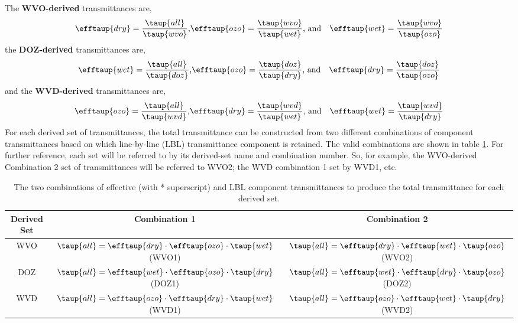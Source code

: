 The \textbf{WVO-derived} transmittances are,
\begin{eqnarray}
  \efftaup{dry} = \frac{\taup{all}}{\taup{wvo}}\textrm{,} & \efftaup{ozo} = \displaystyle\frac{\taup{wvo}}{\taup{wet}} \textrm{, and} & \efftaup{wet} = \frac{\taup{wvo}}{\taup{ozo}}
\end{eqnarray}
the \textbf{DOZ-derived} transmittances are,
\begin{eqnarray}
  \efftaup{wet} = \frac{\taup{all}}{\taup{doz}}\textrm{,} & \efftaup{ozo} = \displaystyle\frac{\taup{doz}}{\taup{dry}} \textrm{, and} & \efftaup{dry} = \frac{\taup{doz}}{\taup{ozo}}
\end{eqnarray}
and the \textbf{WVD-derived} transmittances are,
\begin{eqnarray}
  \efftaup{ozo} = \frac{\taup{all}}{\taup{wvd}}\textrm{,} & \efftaup{dry} = \displaystyle\frac{\taup{wvd}}{\taup{wet}} \textrm{, and} & \efftaup{wet} = \frac{\taup{wvd}}{\taup{dry}}
\end{eqnarray}
For each derived set of transmittances, the total transmittance can be constructed from two different combinations of component transmittances based on which line-by-line (LBL) transmittance component is retained. The valid combinations are shown in table \ref{tab:derived_set_combo}. For further reference, each set will be referred to by its derived-set name and combination number. So, for example, the WVO-derived Combination 2 set of transmittances will be referred to WVO2; the WVD combination 1 set by WVD1, etc.
\begin{table}[htp]
  \centering
  \begin{tabular}{c | c | c}
    Derived Set & Combination 1 & Combination 2\\
    \hline
    WVO & $\taup{all}=\efftaup{dry}\cdot\efftaup{ozo}\cdot\taup{wet}$ (WVO1) & $\taup{all}=\efftaup{dry}\cdot \efftaup{wet}\cdot\taup{ozo}$ (WVO2)\\
    DOZ & $\taup{all}=\efftaup{wet}\cdot\efftaup{ozo}\cdot\taup{dry}$ (DOZ1) & $\taup{all}=\efftaup{wet}\cdot\efftaup{dry}\cdot\taup{ozo}$ (DOZ2)\\
    WVD & $\taup{all}=\efftaup{ozo}\cdot\efftaup{dry}\cdot\taup{wet}$ (WVD1) & $\taup{all}=\efftaup{ozo}\cdot\efftaup{wet}\cdot\taup{dry}$ (WVD2)
  \end{tabular}
  \caption{The two combinations of effective (with * superscript) and LBL component transmittances to produce the total transmittance for each derived set.}
  \label{tab:derived_set_combo}
\end{table}


